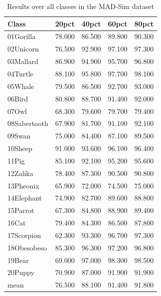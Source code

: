 \begin{table}[!htbp]
\centering
\scriptsize
\setlength{\tabcolsep}{4pt}
\renewcommand{\arraystretch}{0.95}
\begin{tabular}{l r r r r}
\toprule
\textbf{Class} & \textbf{20pct} & \textbf{40pct} & \textbf{60pct} & \textbf{80pct} \\
\midrule
01Gorilla & 78.000 & 86.500 & 89.800 & 90.300 \\
02Unicorn & 76.500 & 92.900 & 97.100 & 97.300 \\
03Mallard & 86.900 & 94.900 & 95.700 & 96.800 \\
04Turtle & 88.100 & 95.800 & 97.700 & 98.100 \\
05Whale & 79.500 & 86.500 & 92.700 & 93.000 \\
06Bird & 80.800 & 88.700 & 91.400 & 92.000 \\
07Owl & 68.300 & 79.600 & 79.700 & 79.400 \\
08Sabertooth & 67.900 & 81.700 & 91.100 & 92.100 \\
09Swan & 75.000 & 84.400 & 87.100 & 89.500 \\
10Sheep & 91.000 & 93.600 & 96.100 & 96.400 \\
11Pig & 85.100 & 92.100 & 95.200 & 95.600 \\
12Zalika & 78.400 & 87.300 & 90.500 & 90.800 \\
13Pheonix & 65.900 & 72.000 & 74.500 & 75.000 \\
14Elephant & 74.900 & 82.700 & 89.600 & 88.800 \\
15Parrot & 67.300 & 84.800 & 88.900 & 89.400 \\
16Cat & 79.400 & 84.300 & 86.500 & 87.800 \\
17Scorpion & 62.300 & 93.300 & 96.700 & 97.300 \\
18Obesobeso & 85.300 & 96.300 & 97.200 & 96.800 \\
19Bear & 69.000 & 97.000 & 98.300 & 98.500 \\
20Puppy & 70.900 & 87.000 & 91.900 & 91.900 \\
\midrule
mean & 76.500 & 88.100 & 91.400 & 91.800 \\
\bottomrule
\end{tabular}
\caption{Results over all classes in the MAD-Sim dataset}
\label{tab:results\_mad}
\end{table}